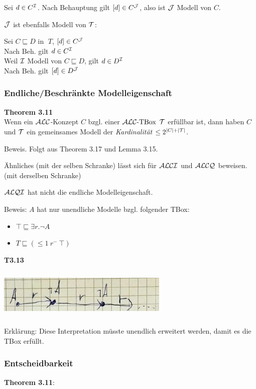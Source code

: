 Sei $d \in C^{\mathcal{I}}$. Nach Behauptung gilt $[d] \in C^{\mathcal{J}}$, also ist $\mathcal{J}$ Modell von $C$.

$\mathcal{J}$ ist ebenfalls Modell von $\mathcal{T}$:

Sei $C \sqsubseteq D$ in $\;T$, $[d] \in C^{\mathcal{J}}$ \\
Nach Beh. gilt $d \in C^{\mathcal{I}}$ \\
Weil $\mathcal{I}$ Modell von $C \sqsubseteq D$, gilt $d \in D^{\mathcal{I}}$ \\
Nach Beh. gilt $[d] \in D^{\mathcal{J}}$

\subsubsection{Endliche/Beschränkte Modelleigenschaft}

\textbf{Theorem 3.11} \\
Wenn ein $\mathcal{A}\mathcal{L}\mathcal{C}$-Konzept $C$ bzgl. einer $\text{$\mathcal{A}\mathcal{L}\mathcal{C}$-TBox}$ $\mathcal{T}$ erfüllbar ist, dann haben $C$ und $\mathcal{T}$ ein gemeinsames Modell der
\emph{Kardinalität} $\leq 2^{\left| C \right| + |\mathcal{T}|}$.

Beweis. Folgt aus Theorem 3.17 und Lemma 3.15.

Ähnliches (mit der selben Schranke) lässt sich für $\mathcal{A}\mathcal{L}\mathcal{C}\mathcal{I}$ und $\mathcal{A}\mathcal{L}\mathcal{C}\mathcal{Q}$ beweisen. (mit derselben Schranke)

\begin{theorem}
$\mathcal{A}\mathcal{L}\mathcal{Q}\mathcal{I}$ hat nicht die endliche Modelleigenschaft.
\end{theorem}

Beweis: $A$ hat nur unendliche Modelle bzgl. folgender TBox:

\begin{itemize}
\item
  $\top \sqsubseteq \exists r.\neg A$
\item
  $T \sqsubseteq ( \leq 1\ r^{-}\ \top)$
\end{itemize}

\textbf{T3.13}

\includegraphics[width=3.21910in,height=0.93200in]{media/318qi.png}

Erklärung: Diese Interpretation müsste unendlich erweitert werden, damit es die TBox erfüllt.

\subsubsection{Entscheidbarkeit}
\textbf{Theorem 3.11}:

